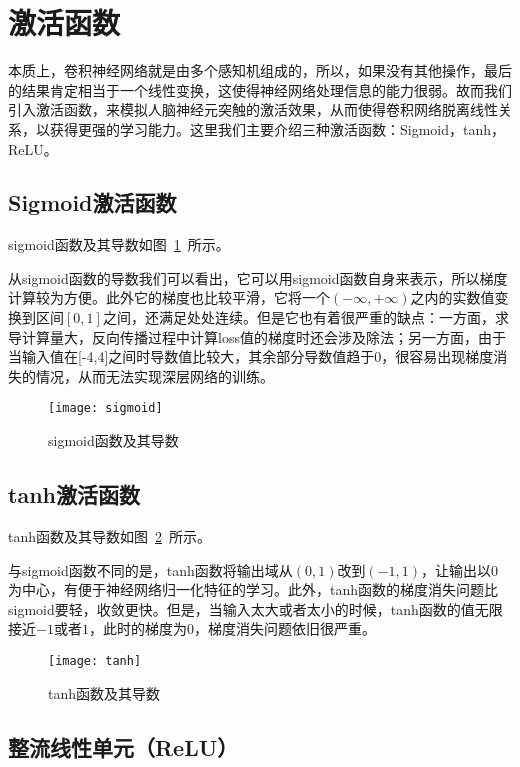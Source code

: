 \section{激活函数}

本质上，卷积神经网络就是由多个感知机组成的，所以，如果没有其他操作，最后的结果肯定相当于一个线性变换，这使得神经网络处理信息的能力很弱。故而我们引入激活函数，来模拟人脑神经元突触的激活效果，从而使得卷积网络脱离线性关系，以获得更强的学习能力。这里我们主要介绍三种激活函数：Sigmoid，tanh，ReLU。

\subsection{Sigmoid激活函数}

sigmoid函数及其导数如图~\ref{piture:8}~所示。

从sigmoid函数的导数我们可以看出，它可以用sigmoid函数自身来表示，所以梯度计算较为方便。此外它的梯度也比较平滑，它将一个$(-\infty ,+\infty)$之内的实数值变换到区间$[0,1]$之间，还满足处处连续。但是它也有着很严重的缺点：一方面，求导计算量大，反向传播过程中计算loss值的梯度时还会涉及除法；另一方面，由于当输入值在[-4,4]之间时导数值比较大，其余部分导数值趋于0，很容易出现梯度消失的情况，从而无法实现深层网络的训练。

\begin{figure}[h]
\centering
\texttt{[image: sigmoid]}
\caption{sigmoid函数及其导数}
\label{piture:8}
\end{figure}

\subsection{tanh激活函数}

tanh函数及其导数如图~\ref{piture:9}~所示。

与sigmoid函数不同的是，tanh函数将输出域从$(0,1)$改到$(-1,1)$，让输出以$0$为中心，有便于神经网络归一化特征的学习。此外，tanh函数的梯度消失问题比sigmoid要轻，收敛更快。但是，当输入太大或者太小的时候，tanh函数的值无限接近$-1$或者$1$，此时的梯度为$0$，梯度消失问题依旧很严重。

\begin{figure}[h]
\centering
\texttt{[image: tanh]}
\caption{tanh函数及其导数}
\label{piture:9}
\end{figure}

\subsection{整流线性单元（ReLU）}

